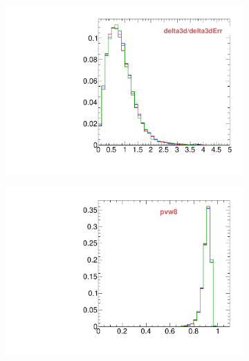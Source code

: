 \begin{figure}
\begin{subfigure}[b]{0.2\textwidth}
                \includegraphics[width=\textwidth]{Figures/VariablesComparison/MC_barrel_figs_3h/delta3d/delta3dErr}
                \label{fig:MC_barrel_delta3d/delta3dErr_3h}
        \end{subfigure}
        \begin{subfigure}[b]{0.2\textwidth}
                \centering
                \includegraphics[width=\textwidth]{Figures/VariablesComparison/MC_barrel_figs_3h/pvw8}
                \label{fig:MC_barrel_pvw8_3h}
        \end{subfigure}
        \begin{subfigure}[b]{0.2\textwidth}
                \centering

\end{subfigure}
\end{figure}
